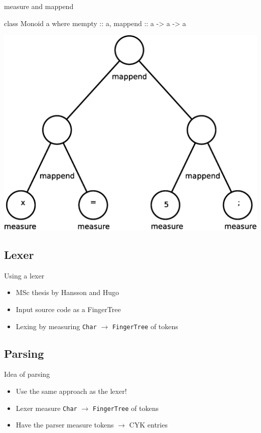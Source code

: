 \documentclass{beamer}
\begin{document}
\begin{frame}[fragile]{measure and mappend}
    \begin{code}
class Monoid a where
    mempty :: a,
    mappend :: a -> a -> a
    \end{code}
    \includegraphics[width=.6\textwidth]{tree.eps}
\end{frame}

\subsection{Lexer}
\begin{frame}{Using a lexer}
    \begin{itemize}
        \item MSc thesis by Hansson and Hugo
        \item Input source code as a FingerTree
        \item Lexing by measuring \texttt{Char} $\rightarrow$
              \texttt{FingerTree} of tokens
    \end{itemize}
\end{frame}

\subsection{Parsing}
\begin{frame}{Idea of parsing}
    \begin{itemize}
        \item Use the same approach as the lexer!
        \item Lexer measure \texttt{Char} $\rightarrow$ \texttt{FingerTree} of tokens
        \item Have the parser measure tokens $\rightarrow$ CYK entries
    \end{itemize}
\end{frame}
\end{document}

